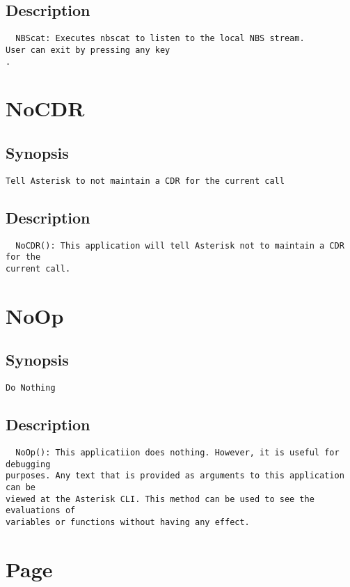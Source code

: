 \subsection{Description}
\begin{verbatim}
  NBScat: Executes nbscat to listen to the local NBS stream.
User can exit by pressing any key
.
\end{verbatim}


\section{NoCDR}
\subsection{Synopsis}
\begin{verbatim}
Tell Asterisk to not maintain a CDR for the current call
\end{verbatim}
\subsection{Description}
\begin{verbatim}
  NoCDR(): This application will tell Asterisk not to maintain a CDR for the
current call.

\end{verbatim}


\section{NoOp}
\subsection{Synopsis}
\begin{verbatim}
Do Nothing
\end{verbatim}
\subsection{Description}
\begin{verbatim}
  NoOp(): This applicatiion does nothing. However, it is useful for debugging
purposes. Any text that is provided as arguments to this application can be
viewed at the Asterisk CLI. This method can be used to see the evaluations of
variables or functions without having any effect.
\end{verbatim}


\section{Page}
